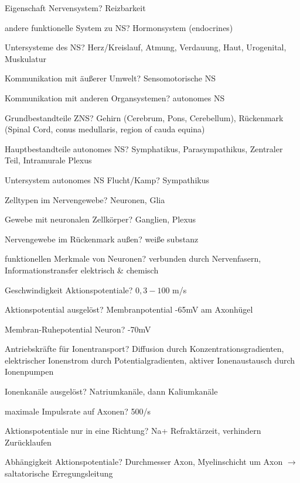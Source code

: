 \documentclass[a4paper]{article}
\begin{document}
\raggedright
\begin{multicols}{3}\scriptsize
  \setlength{\premulticols}{1pt}
  \setlength{\postmulticols}{1pt}
  \setlength{\multicolsep}{1pt}
  \setlength{\columnsep}{2pt}


  Eigenschaft Nervensystem? Reizbarkeit

  andere funktionelle System zu NS? Hormonsystem (endocrines)

  Untersysteme des NS? Herz/Kreislauf, Atmung, Verdauung, Haut, Urogenital, Muskulatur

  Kommunikation mit äußerer Umwelt? Sensomotorische NS

  Kommunikation mit anderen Organsystemen? autonomes NS

  Grundbestandteile ZNS? Gehirn (Cerebrum, Pons, Cerebellum), Rückenmark (Spinal Cord, conus medullaris, region of cauda equina)

  Hauptbestandteile autonomes NS? Symphatikus, Parasympathikus, Zentraler Teil, Intramurale Plexus

  Untersystem autonomes NS Flucht/Kamp? Sympathikus

  Zelltypen im Nervengewebe? Neuronen, Glia

  Gewebe mit neuronalen Zellkörper? Ganglien, Plexus

  Nervengewebe im Rückenmark außen? weiße substanz

  funktionellen Merkmale von Neuronen? verbunden durch Nervenfasern, Informationstransfer elektrisch \& chemisch

  Geschwindigkeit Aktionspotentiale? $0,3 - 100$ m/s

  Aktionspotential ausgelöst? Membranpotential -65mV am Axonhügel

  Membran-Ruhepotential Neuron? -70mV

  Antriebskräfte für Ionentransport? Diffusion durch Konzentrationsgradienten, elektrischer Ionenstrom durch Potentialgradienten, aktiver Ionenaustausch durch Ionenpumpen

  Ionenkanäle ausgelöst? Natriumkanäle, dann Kaliumkanäle

  maximale Impulsrate auf Axonen? 500/s

  Aktionspotentiale nur in eine Richtung? Na+ Refraktärzeit, verhindern Zurücklaufen

  Abhängigkeit Aktionspotentiale? Durchmesser Axon, Myelinschicht um Axon $\rightarrow$ saltatorische Erregungsleitung


\end{multicols}
\end{document}
